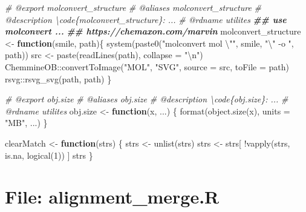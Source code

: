 \documentclass[
]{article}
\newenvironment{Shaded}{\begin{snugshade}}{\end{snugshade}}
\newcommand{\AttributeTok}[1]{\textcolor[rgb]{0.77,0.63,0.00}{#1}}
\newcommand{\CommentTok}[1]{\textcolor[rgb]{0.56,0.35,0.01}{\textit{#1}}}
\newcommand{\ControlFlowTok}[1]{\textcolor[rgb]{0.13,0.29,0.53}{\textbf{#1}}}
\newcommand{\DecValTok}[1]{\textcolor[rgb]{0.00,0.00,0.81}{#1}}
\newcommand{\DocumentationTok}[1]{\textcolor[rgb]{0.56,0.35,0.01}{\textbf{\textit{#1}}}}
\newcommand{\FunctionTok}[1]{\textcolor[rgb]{0.00,0.00,0.00}{#1}}
\newcommand{\NormalTok}[1]{#1}
\newcommand{\OtherTok}[1]{\textcolor[rgb]{0.56,0.35,0.01}{#1}}
\newcommand{\SpecialCharTok}[1]{\textcolor[rgb]{0.00,0.00,0.00}{#1}}
\newcommand{\StringTok}[1]{\textcolor[rgb]{0.31,0.60,0.02}{#1}}
\begin{document}
\begin{Shaded}
\begin{Highlighting}[]
\CommentTok{\#\textquotesingle{} @export molconvert\_structure}
\CommentTok{\#\textquotesingle{} @aliases molconvert\_structure}
\CommentTok{\#\textquotesingle{} @description \textbackslash{}code\{molconvert\_structure\}: ...}
\CommentTok{\#\textquotesingle{} @rdname utilites}
\DocumentationTok{\#\# use \textquotesingle{}molconvert\textquotesingle{} ...}
\DocumentationTok{\#\# https://chemaxon.com/marvin}
\NormalTok{molconvert\_structure }\OtherTok{\textless{}{-}}
  \ControlFlowTok{function}\NormalTok{(smile, path)\{}
    \FunctionTok{system}\NormalTok{(}\FunctionTok{paste0}\NormalTok{(}\StringTok{"molconvert mol }\SpecialCharTok{\textbackslash{}"}\StringTok{"}\NormalTok{, smile, }\StringTok{"}\SpecialCharTok{\textbackslash{}"}\StringTok{ {-}o "}\NormalTok{, path))}
\NormalTok{    src }\OtherTok{\textless{}{-}} \FunctionTok{paste}\NormalTok{(}\FunctionTok{readLines}\NormalTok{(path), }\AttributeTok{collapse =} \StringTok{"}\SpecialCharTok{\textbackslash{}n}\StringTok{"}\NormalTok{)}
\NormalTok{    ChemmineOB}\SpecialCharTok{::}\FunctionTok{convertToImage}\NormalTok{(}\StringTok{"MOL"}\NormalTok{, }\StringTok{"SVG"}\NormalTok{, }\AttributeTok{source =}\NormalTok{ src, }\AttributeTok{toFile =}\NormalTok{ path)}
\NormalTok{    rsvg}\SpecialCharTok{::}\FunctionTok{rsvg\_svg}\NormalTok{(path, path)}
\NormalTok{  \}}

\CommentTok{\#\textquotesingle{} @export obj.size}
\CommentTok{\#\textquotesingle{} @aliases obj.size}
\CommentTok{\#\textquotesingle{} @description \textbackslash{}code\{obj.size\}: ...}
\CommentTok{\#\textquotesingle{} @rdname utilites}
\NormalTok{obj.size }\OtherTok{\textless{}{-}} \ControlFlowTok{function}\NormalTok{(x, ...) \{}
  \FunctionTok{format}\NormalTok{(}\FunctionTok{object.size}\NormalTok{(x), }\AttributeTok{units =} \StringTok{"MB"}\NormalTok{, ...)}
\NormalTok{\}}

\NormalTok{clearMatch }\OtherTok{\textless{}{-}} \ControlFlowTok{function}\NormalTok{(strs)}
\NormalTok{\{}
\NormalTok{  strs }\OtherTok{\textless{}{-}} \FunctionTok{unlist}\NormalTok{(strs)}
\NormalTok{  strs }\OtherTok{\textless{}{-}}\NormalTok{ strs[ }\SpecialCharTok{!}\FunctionTok{vapply}\NormalTok{(strs, is.na, }\FunctionTok{logical}\NormalTok{(}\DecValTok{1}\NormalTok{)) ]}
\NormalTok{  strs}
\NormalTok{\}}
\end{Highlighting}
\end{Shaded}

\hypertarget{file-alignment_merge.r}{%
\section{File: alignment\_merge.R}\label{file-alignment_merge.r}}
\end{document}
